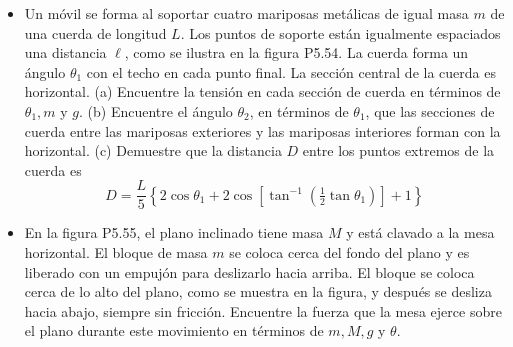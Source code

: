 \documentclass[11pt,a4paper]{article}
\begin{document}
\begin{itemize}
    \item[\textbf{54.}] Un móvil se forma al soportar cuatro mariposas metálicas de igual masa $m$ de una cuerda de longitud $L$. Los puntos de soporte están igualmente espaciados una distancia $\ell$, como se ilustra en la figura P5.54. La cuerda forma un ángulo $\theta_1$ con el techo en cada punto final. La sección central de la cuerda es horizontal. (a) Encuentre la tensión en cada sección de cuerda en términos de $\theta_1, m$ y $g$. (b) Encuentre el ángulo $\theta_2$, en términos de $\theta_1$, que las secciones de cuerda entre las mariposas exteriores y las mariposas interiores forman con la horizontal. (c) Demuestre que la distancia $D$ entre los puntos extremos de la cuerda es
    $$ D = \frac{L}{5} \left\{ 2 \cos\theta_1 + 2\cos[\tan^{-1}(\tfrac{1}{2}\tan\theta_1)] + 1 \right\} $$
    \vspace*{8cm}

    \item[\textbf{55.}] En la figura P5.55, el plano inclinado tiene masa $M$ y está clavado a la mesa horizontal. El bloque de masa $m$ se coloca cerca del fondo del plano y es liberado con un empujón para deslizarlo hacia arriba. El bloque se coloca cerca de lo alto del plano, como se muestra en la figura, y después se desliza hacia abajo, siempre sin fricción. Encuentre la fuerza que la mesa ejerce sobre el plano durante este movimiento en términos de $m, M, g$ y $\theta$.
    \vspace*{7cm}
\end{itemize}
\end{document}
